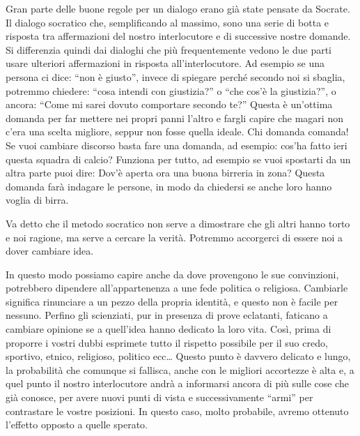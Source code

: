 \documentclass[12pt]{book} %
\begin{document}
Gran parte delle buone regole per un dialogo erano già state pensate da Socrate. Il dialogo socratico che, 
semplificando al massimo, sono una serie di botta e risposta tra affermazioni del nostro interlocutore e
di successive nostre domande. Si differenzia quindi dai dialoghi che più frequentemente vedono le due parti usare
ulteriori affermazioni in risposta all'interlocutore. Ad esempio se una persona ci dice: “non è
giusto”, invece di spiegare perché secondo noi si sbaglia, potremmo chiedere: “cosa intendi con giustizia?” o “che
cos'è la giustizia?”, o ancora: “Come mi sarei dovuto comportare secondo te?” Questa è
un'ottima domanda per far mettere nei propri panni l'altro e fargli capire
che magari non c'era una scelta migliore, seppur non fosse quella ideale.
Chi domanda comanda! Se vuoi cambiare discorso basta fare una domanda, ad esempio: cos'ha fatto ieri questa squadra di calcio?
Funziona per tutto, ad esempio se vuoi spostarti da un altra parte puoi dire: Dov'è aperta ora una buona birreria in zona? Questa domanda farà indagare le persone, in modo da chiedersi se anche loro hanno voglia di birra.

Va detto che il metodo socratico non serve a dimostrare che gli altri hanno torto e noi ragione, ma serve a cercare la
verità. Potremmo accorgerci di essere noi a dover cambiare idea.

In questo modo possiamo capire anche da dove provengono le sue convinzioni, potrebbero dipendere
all'appartenenza a une fede politica o religiosa. Cambiarle significa rinunciare a un pezzo della
propria identità, e questo non è facile per nessuno. Perfino gli scienziati, pur in presenza di prove eclatanti,
faticano a cambiare opinione se a quell'idea hanno dedicato la loro vita. Così, prima di proporre
i vostri dubbi esprimete tutto il rispetto possibile per il suo credo, sportivo, etnico, religioso, politico ecc…
Questo punto è davvero delicato e lungo, la probabilità che comunque si fallisca, anche con le migliori accortezze è
alta e, a quel punto il nostro interlocutore andrà a informarsi ancora di più sulle cose che già conosce, per avere
nuovi punti di vista e successivamente “armi” per contrastare le vostre posizioni. In questo caso, molto probabile,
avremo ottenuto l'effetto opposto a quelle sperato.
\end{document}
